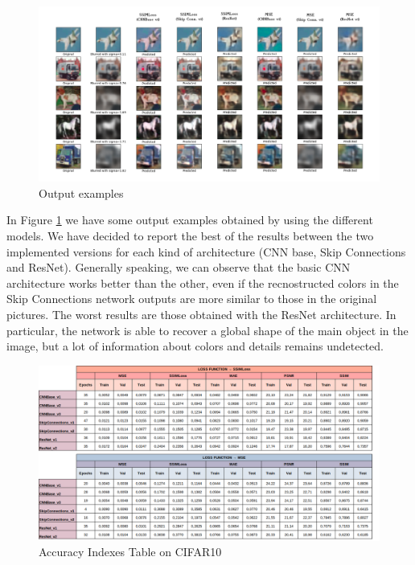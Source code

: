 \documentclass[12pt,a4paper]{report}
\begin{document}
\begin{figure}[hptb]
\centering
\includegraphics[scale=0.26]{Outputs_comparison.png}
\caption{Output examples}
\label{CIFAR10Output}
\end{figure}

In Figure \ref{CIFAR10Output} we have some output examples obtained by using the different models. We have decided to report the best of the results between the two implemented versions for each kind of architecture (CNN base, Skip Connections and ResNet).
Generally speaking, we can observe that the basic CNN architecture works better than the other, even if the recnostructed colors in the Skip Connections network outputs are more similar to those in the original pictures. The worst results are those obtained with the ResNet architecture. In particular, the network is able to recover a global shape of the main object in the image, but a lot of information about colors and details remains undetected.

\begin{figure}[hptb]
\centering
\includegraphics[scale=0.45]{table.png}
\caption{Accuracy Indexes Table on CIFAR10}
\label{Table1}
\end{figure}
\end{document}
